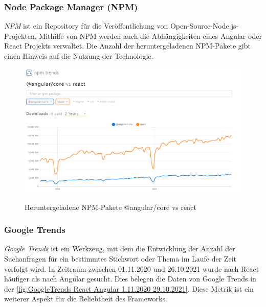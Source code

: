 \newpage
\subsubsection*{Node Package Manager (NPM)}
\textit{NPM} ist ein Repository für die Veröffentlichung von Open-Source-Node.js-Projekten. Mithilfe von NPM werden auch die Abhängigkeiten eines Angular oder React Projekts verwaltet. Die Anzahl der heruntergeladenen NPM-Pakete gibt einen Hinweis auf die Nutzung der Technologie.
\begin{figure}[h!]
  \centering
  \includegraphics[scale=0.4]{sources/NPM-Trends React_Angular}
  \caption[Heruntergeladene NPM-Pakete]{}
  \label{fig:NPM-Trends React_Angular} 
  Heruntergeladene NPM-Pakete @angular/core vs react
   {\cite{NPM01}}
\end{figure}


\subsubsection*{Google Trends}
\textit{Google Trends} ist ein Werkzeug, mit dem die Entwicklung der Anzahl der Suchanfragen für ein bestimmtes Stichwort oder Thema im Laufe der Zeit verfolgt wird\cite{GO02}. In Zeitraum zwischen 01.11.2020 und 26.10.2021 wurde nach React häufiger als nach Angular gesucht. Dies belegen die Daten von Google Trends in der \autoref{fig:GoogleTrends React Angular 1.11.2020 29.10.2021}. Diese Metrik ist ein weiterer Aspekt für die Beliebtheit des Frameworks.

